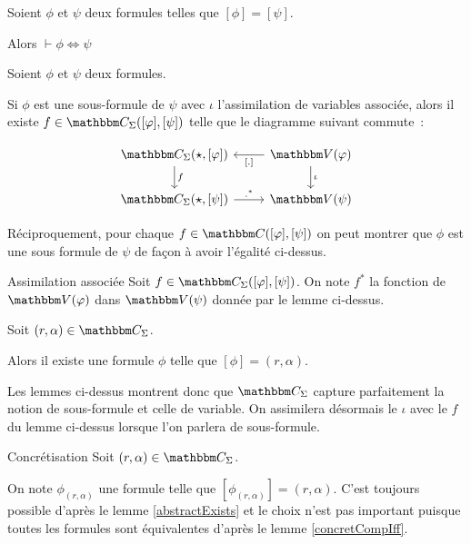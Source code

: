 \begin{lem}\label{concretCompIff}
    Soient $\phi$ et $\psi$ deux formules telles que $[\phi] = [\psi]$.

    Alors $\vdash \phi\iff\psi$
\end{lem}

\begin{lem}\label{varAlongSub}
    Soient $\phi$ et $\psi$ deux formules.
    
    Si $\phi$ est une sous-formule de $\psi$ avec $\iota$ l'assimilation de
    variables associée, alors il existe $f\in\C_\Sigma([\phi], [\psi])$ telle
    que le diagramme suivant commute~:

    \[\begin{tikzcd}
        \C_\Sigma(\star,[\phi]) \arrow[d, "f"] & \V(\phi) \arrow[d, "\iota"]
                                                          \arrow[l, "\brk{.}"] \\
        \C_\Sigma(\star,[\psi]) \arrow[r, ".^*"] & \V(\psi)
    \end{tikzcd}\]

    Réciproquement, pour chaque $f\in\C([\phi], [\psi])$ on peut montrer que $\phi$ est
    une sous formule de $\psi$ de façon à avoir l'égalité ci-dessus.
\end{lem}

\begin{defi}{Assimilation associée}
    Soit $f\in\C_\Sigma([\phi],[\psi])$. On note $f^*$ la fonction de $\V(\phi)$ dans
    $\V(\psi)$ donnée par le lemme ci-dessus.
\end{defi}

\begin{lem}\label{abstractExists}
    Soit $(r,\alpha)\in\C_\Sigma$.

    Alors il existe une formule $\phi$ telle que $[\phi] = (r,\alpha)$.
\end{lem}

Les lemmes ci-dessus montrent donc que $\C_\Sigma$ capture parfaitement la notion de
sous-formule et celle de variable. On assimilera désormais le $\iota$ avec le $f$ du
lemme ci-dessus lorsque l'on parlera de sous-formule.

\begin{defi}{Concrétisation}
    Soit $(r,\alpha)\in\C_\Sigma$.

    On note $\phi_{(r,\alpha)}$ une formule telle que $[\phi_{(r,\alpha)}] = (r,\alpha)$.
    C'est toujours possible d'après le lemme \ref{abstractExists} et le choix n'est
    pas important puisque toutes les formules sont équivalentes d'après le lemme
    \ref{concretCompIff}.
\end{defi}

